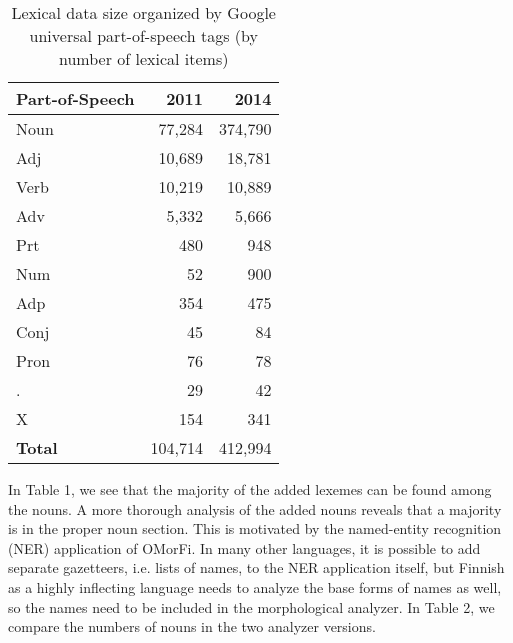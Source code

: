 \documentclass[11pt]{article}
\begin{document}
\begin{table}[h]
    \begin{center}
        \begin{tabular}{|l|rr|}
            \hline
            \bf Part-of-Speech & \bf 2011 & \bf 2014 \\
            \hline
            \sc Noun           & 77,284   & 374,790 \\
            \sc Adj            & 10,689   & 18,781 \\
            \sc Verb           & 10,219   & 10,889 \\
            \sc Adv            & 5,332    & 5,666 \\
            \sc Prt            & 480      & 948 \\
            \sc Num            & 52       & 900 \\
            \sc Adp            & 354      & 475 \\
            \sc Conj           & 45       & 84 \\
            \sc Pron           & 76       & 78 \\
            \sc .              & 29       & 42 \\
            \sc X              & 154      & 341 \\
            \hline
            \bf Total          & 104,714  & 412,994 \\
            \hline
        \end{tabular}
    \end{center}
    \caption{Lexical data size organized by Google universal part-of-speech tags (by number of lexical items)}
\end{table}

In Table 1, we see that the majority of the added lexemes can be found among
the nouns.  A more thorough analysis of the added nouns reveals that a majority
is in the proper noun section.  This is motivated by the named-entity
recognition (NER) application of OMorFi.  In many other languages, it is
possible to add separate gazetteers, i.e. lists of names, to the NER
application itself, but Finnish as a highly inflecting language needs to
analyze the base forms of names as well, so the names need to be included in
the morphological analyzer.  In Table 2, we compare the numbers of nouns in the
two analyzer versions.
\end{document}
